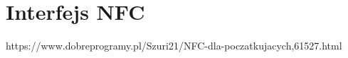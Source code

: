 \section{Interfejs NFC}
\label{NFC}

https://www.dobreprogramy.pl/Szuri21/NFC-dla-poczatkujacych,61527.html